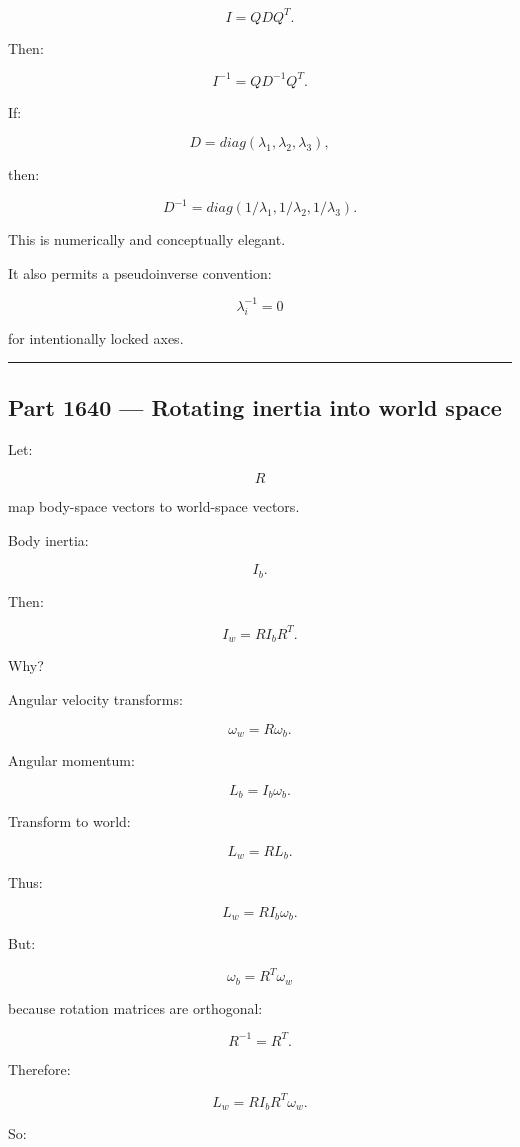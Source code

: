 \[
I=QDQ^T.
\]

Then:

\[
I^{-1}
=
QD^{-1}Q^T.
\]

If:

\[
D=
diag(\lambda_1,\lambda_2,\lambda_3),
\]

then:

\[
D^{-1}
=
diag(
1/\lambda_1,
1/\lambda_2,
1/\lambda_3
).
\]

This is numerically and conceptually elegant.

It also permits a pseudoinverse convention:

\[
\lambda_i^{-1}=0
\]

for intentionally locked axes.

\begin{center}\rule{0.5\linewidth}{0.5pt}\end{center}

\subsection{Part 1640 --- Rotating inertia into world space}\label{06-engine-ii-ch035-part-1640-rotating-inertia-into-world-space}

Let:

\[
R
\]

map body-space vectors to world-space vectors.

Body inertia:

\[
I_b.
\]

Then:

\[
\boxed{
I_w
=
RI_bR^T.
}
\]

Why?

Angular velocity transforms:

\[
\omega_w=
R\omega_b.
\]

Angular momentum:

\[
L_b=
I_b\omega_b.
\]

Transform to world:

\[
L_w=
RL_b.
\]

Thus:

\[
L_w=
RI_b\omega_b.
\]

But:

\[
\omega_b=
R^T\omega_w
\]

because rotation matrices are orthogonal:

\[
R^{-1}=R^T.
\]

Therefore:

\[
L_w=
RI_bR^T\omega_w.
\]

So:

